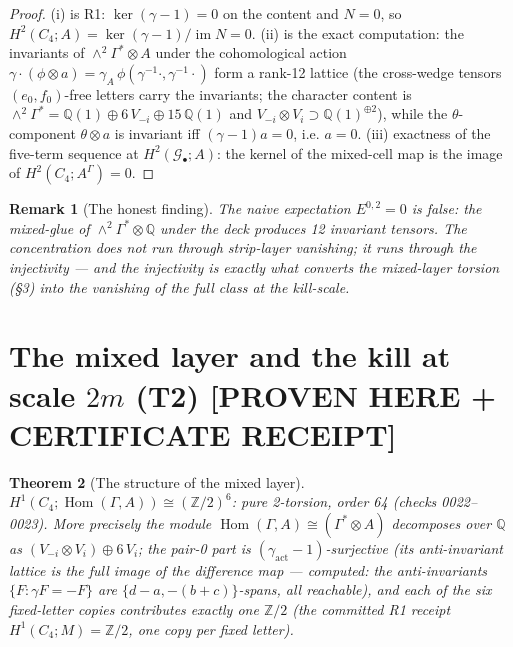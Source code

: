 \documentclass[11pt]{article}
\newtheorem{theorem}{Theorem}
\newtheorem{remark}[theorem]{Remark}
\newcommand{\GammaL}{\Gamma}
\newcommand{\Cfour}{C_4}
\newcommand{\Gbul}{\mathcal{G}_\bullet}
\newcommand{\im}{\operatorname{im}}
\newcommand{\Hom}{\operatorname{Hom}}
\newcommand{\Z}{\mathbb{Z}}
\newcommand{\Q}{\mathbb{Q}}
\begin{document}
\begin{proof}
(i) is R1: $\ker(\gamma-1)=0$ on the content and $N=0$, so
$H^2(\Cfour;A)=\ker(\gamma-1)/\im N=0$. (ii) is the exact computation:
the invariants of $\wedge^2\GammaL^*\otimes A$ under the cohomological
action $\gamma\cdot(\phi\otimes a)=\gamma_A\,\phi(\gamma^{-1}\cdot,
\gamma^{-1}\cdot)$ form a rank-12 lattice (the cross-wedge tensors
$(e_0,f_0)$-free letters carry the invariants; the character content is
$\wedge^2\GammaL^*=\Q(1)\oplus 6\,V_{-i}\oplus 15\,\Q(1)$ and
$V_{-i}\otimes V_i\supset\Q(1)^{\oplus 2}$), while the
$\theta$-component $\theta\otimes a$ is invariant iff
$(\gamma-1)a=0$, i.e. $a=0$. (iii) exactness of the five-term sequence
at $H^2(\Gbul;A)$: the kernel of the mixed-cell map is the image of
$H^2(\Cfour;A^\GammaL)=0$.
\end{proof}

\begin{remark}[The honest finding]
The naive expectation $E^{0,2}=0$ is false: the mixed-glue of
$\wedge^2\GammaL^*\otimes\Q$ under the deck produces 12 invariant
tensors. The concentration does not run through strip-layer vanishing;
it runs through the \emph{injectivity} — and the injectivity is exactly
what converts the mixed-layer torsion (§3) into the vanishing of the
full class at the kill-scale.
\end{remark}

\section{The mixed layer and the kill at scale $2m$ (T2) [PROVEN HERE + CERTIFICATE RECEIPT]}

\begin{theorem}[The structure of the mixed layer]
$H^1(\Cfour;\Hom(\GammaL,A))\cong(\Z/2)^6$: pure 2-torsion, order 64
(checks 0022--0023). More precisely the module
$\Hom(\GammaL,A)\cong(\GammaL^*\otimes A)$ decomposes over $\Q$ as
$(V_{-i}\otimes V_i)\oplus 6\,V_i$; the pair-0 part is
$(\gamma_{\mathrm{act}}-1)$-surjective (its anti-invariant lattice is
the full image of the difference map — computed: the anti-invariants
$\{F:\gamma F=-F\}$ are $\{d-a,-(b+c)\}$-spans, all reachable), and each
of the six fixed-letter copies contributes exactly one $\Z/2$
(the committed R1 receipt $H^1(\Cfour;M)=\Z/2$, one copy per fixed
letter).
\end{theorem}
\end{document}

